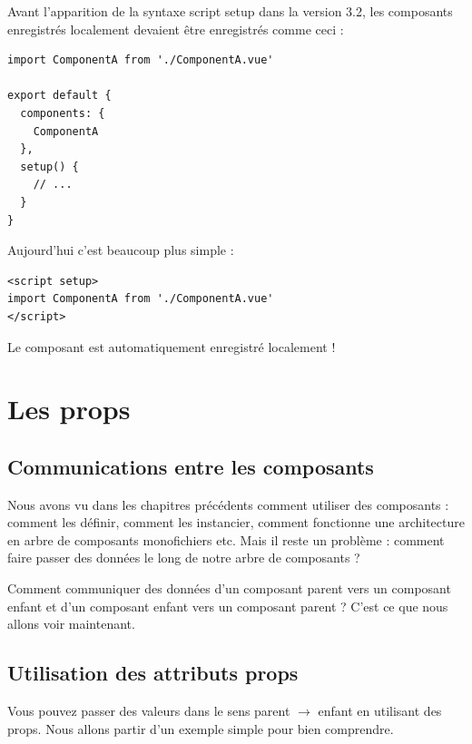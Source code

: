 Avant l'apparition de la syntaxe {\color{monOrange}script setup} dans la version {\color{monOrange}3.2}, les composants enregistrés localement devaient être enregistrés comme ceci :
\begin{verbatim}
import ComponentA from './ComponentA.vue'

export default {
  components: {
    ComponentA
  },
  setup() {
    // ...
  }
}
\end{verbatim}
Aujourd'hui c'est beaucoup plus simple :
\begin{verbatim}
<script setup>
import ComponentA from './ComponentA.vue'
</script>
\end{verbatim}
Le composant est automatiquement enregistré localement !



\section{Les props}
\subsection{Communications entre les composants}
Nous avons vu dans les chapitres précédents comment utiliser des composants : comment les définir, comment les instancier, comment fonctionne une architecture en arbre de composants monofichiers etc. Mais il reste un problème : comment faire passer des données le long de notre arbre de composants ?

Comment communiquer des données d'un composant parent vers un composant enfant et d'un composant enfant vers un composant parent ? C'est ce que nous allons voir maintenant.

\subsection{Utilisation des attributs {\color{monOrange}props}}
Vous pouvez passer des valeurs dans le sens parent $\to$ enfant en utilisant des {\color{monOrange}props}. Nous allons partir d'un exemple simple pour bien comprendre.

